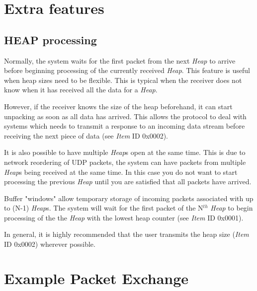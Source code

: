 \documentclass[11pt,english,twoside]{article}
\begin{document}
\section{Extra features}


\subsection{HEAP processing}

Normally, the system waits for the first packet from the next \emph{Heap} to arrive before beginning processing of the currently received
\emph{Heap}. This feature is useful when heap sizes need to be flexible. This is typical when the receiver does not know when it has received
all the data for a \emph{Heap}.

However, if the receiver knows the size of the heap beforehand, it can start unpacking as soon as all data has arrived. This allows the protocol
to deal with systems which needs to transmit a response to an incoming data stream before receiving the next piece of data (see \emph{Item} ID
0x0002).

It is also possible to have multiple \emph{Heap}s open at the same time. This is due to network reordering of UDP packets, the system can have
packets from multiple \emph{Heap}s being received at the same time. In this case you do not want to start processing the previous \emph{Heap}
until you are satisfied that all packets have arrived.

Buffer "windows" allow temporary storage of incoming packets associated with up to (N-1) \emph{Heap}s. The system will wait for the first
packet of the N$^{th}$ \emph{Heap} to begin processing of the the \emph{Heap} with the lowest heap counter (see \emph{Item} ID 0x0001).

In general, it is highly recommended that the user transmits the heap size (\emph{Item} ID 0x0002) wherever possible.


\appendix

\newpage
\clearpage
\section{Example Packet Exchange}
\end{document}
